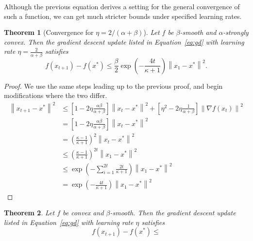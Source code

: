 \documentclass{article}
\newcommand{\norm}[1]{\left\| #1 \right\| }
\newtheorem{theorem}{Theorem}
\theoremstyle{definition}
\begin{document}
Although the previous equation derives a setting for the general convergence of
such a function, we can get much stricter bounds under specified learning rates.

\begin{theorem}[Convergence for $\eta = 2 / (\alpha + \beta)$]
    Let $f$ be $\beta$-smooth and $\alpha$-strongly convex. Then the
    gradient descent update listed in Equation~\ref{eq:gd} with learning rate
    $\eta = \frac{2}{\alpha + \beta} $ satisfies
    \begin{equation}
        f(x_{t+1}) - f(x^*) \leq \frac{\beta}{2} \exp \left( - \frac{4t}{\kappa
        + 1} \right) \norm{x_1 - x^*}^2.
    \end{equation}
\end{theorem}

\begin{proof}
    We use the same steps leading up to the previous proof, and begin
    modifications where the two differ.
    \begin{equation}
        \begin{aligned}
            \norm{x_{t + 1} - x^*}^2 
            &\leq \left[ 1 - 2\eta \frac{\alpha \beta}{\alpha + \beta}
            \right]\norm{x_t - x^*}^2 + \left[  \eta^2  - 2\eta\frac{1}{\alpha +
            \beta} \right]\norm{\nabla f(x_t)}^2\\
            &= \left[ 1 - 2\eta \frac{\alpha \beta}{\alpha + \beta}
            \right]\norm{x_t - x^*}^2 \\
            &= {\left( \frac{\kappa - 1}{\kappa + 1} 
            \right)}^2\norm{x_t - x^*}^2 \\
            &\leq {\left( \frac{\kappa - 1}{\kappa + 1} 
            \right)}^{2t}\norm{x_1 - x^*}^2 \\
            &\leq \exp \left( -\sum_{i = 1}^{2t} \frac{2t}{\kappa
        + 1} \right) \norm{x_1 - x^*}^2 \\
            &= \exp \left( - \frac{4t}{\kappa
        + 1} \right) \norm{x_1 - x^*}^2
        \end{aligned}
    \end{equation}
\end{proof}

\begin{theorem}
    Let $f$ be convex and $\beta$-smooth. Then the
    gradient descent update listed in Equation~\ref{eq:gd} with learning rate
    $\eta$ satisfies
    \begin{equation}
        f(x_{t+1}) - f(x^*) \leq 
    \end{equation}
\end{theorem}
\end{document}
